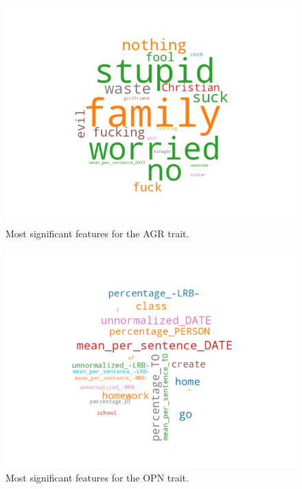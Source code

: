 \documentclass[10pt, a4paper]{article}
\begin{document}
\begin{figure}
\begin{center}
  \includegraphics[width=\columnwidth]{figures/cAGR.png}
  \caption{Most significant features for the AGR trait.}
  \label{fig:figure2}
\end{center}
\end{figure}

\begin{figure}
\begin{center}
  \includegraphics[width=\columnwidth]{figures/cOPN.png}
  \caption{Most significant features for the OPN trait.}
  \label{fig:figure3}
\end{center}
\end{figure}
\end{document}
